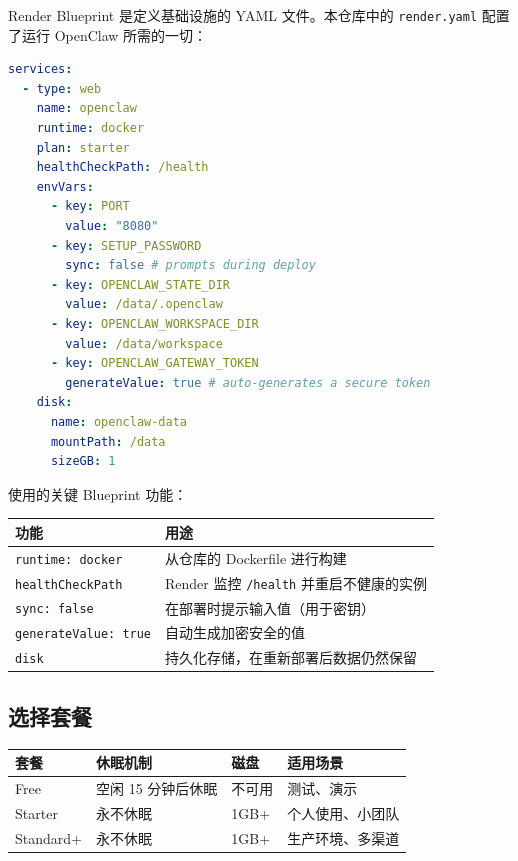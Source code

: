Render Blueprint 是定义基础设施的 YAML 文件。本仓库中的 \texttt{render.yaml} 配置了运行 OpenClaw 所需的一切：

\begin{lstlisting}[language=yaml]
services:
  - type: web
    name: openclaw
    runtime: docker
    plan: starter
    healthCheckPath: /health
    envVars:
      - key: PORT
        value: "8080"
      - key: SETUP_PASSWORD
        sync: false # prompts during deploy
      - key: OPENCLAW_STATE_DIR
        value: /data/.openclaw
      - key: OPENCLAW_WORKSPACE_DIR
        value: /data/workspace
      - key: OPENCLAW_GATEWAY_TOKEN
        generateValue: true # auto-generates a secure token
    disk:
      name: openclaw-data
      mountPath: /data
      sizeGB: 1
\end{lstlisting}


使用的关键 Blueprint 功能：


\begin{table}[h]
\centering
\small
\begin{tabular}{|l|l|}
\hline
功能 & 用途 \\
\hline
\texttt{runtime: docker} & 从仓库的 Dockerfile 进行构建 \\
\hline
\texttt{healthCheckPath} & Render 监控 \texttt{/health} 并重启不健康的实例 \\
\hline
\texttt{sync: false} & 在部署时提示输入值（用于密钥） \\
\hline
\texttt{generateValue: true} & 自动生成加密安全的值 \\
\hline
\texttt{disk} & 持久化存储，在重新部署后数据仍然保留 \\
\hline
\end{tabular}
\end{table}



\subsection{选择套餐}



\begin{table}[h]
\centering
\small
\begin{tabular}{|l|l|l|l|}
\hline
套餐 & 休眠机制 & 磁盘 & 适用场景 \\
\hline
Free & 空闲 15 分钟后休眠 & 不可用 & 测试、演示 \\
\hline
Starter & 永不休眠 & 1GB+ & 个人使用、小团队 \\
\hline
Standard+ & 永不休眠 & 1GB+ & 生产环境、多渠道 \\
\hline
\end{tabular}
\end{table}



